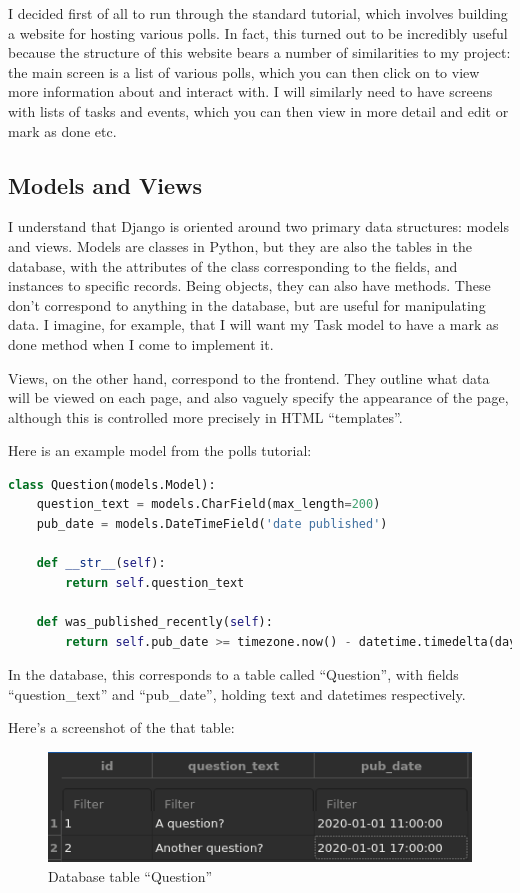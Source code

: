\documentclass{article}
\begin{document}
I decided first of all to run through the standard tutorial,
which involves building a website for hosting various polls.
In fact, this turned out to be incredibly useful because the structure of this website bears a number of similarities to my project:
the main screen is a list of various polls,
which you can then click on to view more information about and interact with.
I will similarly need to have screens with lists of tasks and events,
which you can then view in more detail and edit or mark as done etc.

\subsection{Models and Views}
I understand that Django is oriented around two primary data structures:
models and views.
Models are classes in Python,
but they are also the tables in the database,
with the attributes of the class corresponding to the fields,
and instances to specific records.
Being objects, they can also have methods.
These don't correspond to anything in the database,
but are useful for manipulating data.
I imagine, for example, that I will want my Task model to have a mark as done method when I come to implement it.

Views, on the other hand, correspond to the frontend.
They outline what data will be viewed on each page,
and also vaguely specify the appearance of the page,
although this is controlled more precisely in HTML ``templates''.

Here is an example model from the polls tutorial:
\begin{lstlisting}[language=Python, breaklines]
class Question(models.Model):
    question_text = models.CharField(max_length=200)
    pub_date = models.DateTimeField('date published')

    def __str__(self):
        return self.question_text

    def was_published_recently(self):
        return self.pub_date >= timezone.now() - datetime.timedelta(days=1)
\end{lstlisting}

In the database,
this corresponds to a table called ``Question'',
with fields ``question\_text'' and ``pub\_date'',
holding text and datetimes respectively.

Here's a screenshot of the that table:

\begin{figure}[h!]
  \includegraphics[width=\linewidth]{Images/question_table.png}
  \caption{Database table ``Question''}
  \label{fig:database1}
\end{figure}
\end{document}
